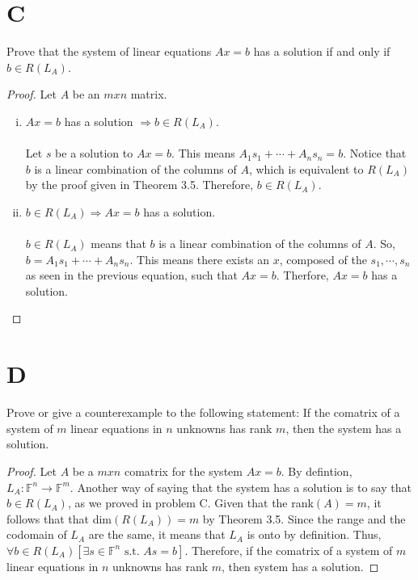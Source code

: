 \documentclass[11pt]{scrartcl}
\begin{document}
\section{C}
Prove that the system of linear equations $Ax = b$ has a solution if and only if $b \in R(L_A)$.
\begin{proof}
	Let $A$ be an $mxn$ matrix.
	\begin{enumerate}[i.]
		\item{
			$Ax = b$ has a solution $\Rightarrow b \in R(L_A)$.\\\-\\
			Let $s$ be a solution to $Ax = b$. This means $A_1s_1 + \cdots + A_ns_n = b$. 
			Notice that $b$ is a linear combination of the columns of $A$, 
			which is equivalent to $R(L_A)$ by the proof given in Theorem 3.5. 
			Therefore, $b \in R(L_A)$.
		}
		\item{
			$b \in R(L_A) \Rightarrow Ax = b$ has a solution.\\\-\\
			$b \in R(L_A)$ means that $b$ is a linear combination of the columns of $A$. 
			So, $b = A_1s_1 + \cdots + A_ns_n$. 
			This means there exists an $x$, composed of the $s_1, \cdots, s_n$ as seen in the previous equation, such that $Ax = b$.  
			Therfore, $Ax = b$ has a solution.
		}
	\end{enumerate}
\end{proof}

\section{D}
Prove or give a counterexample to the following statement: If the comatrix of a system of $m$ linear equations in
$n$ unknowns has rank $m$, then the system has a solution.
\begin{proof}
Let $A$ be a $mxn$ comatrix for the system $Ax=b$. By defintion, $L_A: \mathbb{F}^n \rightarrow \mathbb{F}^m$. 
Another way of saying that the system has a solution is to say that $b \in R(L_A)$, as we proved
in problem C. Given that the rank$(A)=m$, it follows that that dim$(R(L_A)) = m $ by Theorem 3.5. 
Since the range and the codomain of $L_A$ are the same, it means that $L_A$ is onto by definition. 
Thus, $\forall b \in R(L_A) [\exists s \in \mathbb{F}^n \text{ s.t. } As = b]$.
Therefore, if the comatrix of a system of $m$ linear equations in
$n$ unknowns has rank $m$, then system has a solution.
\end{proof}
	
\end{document}
